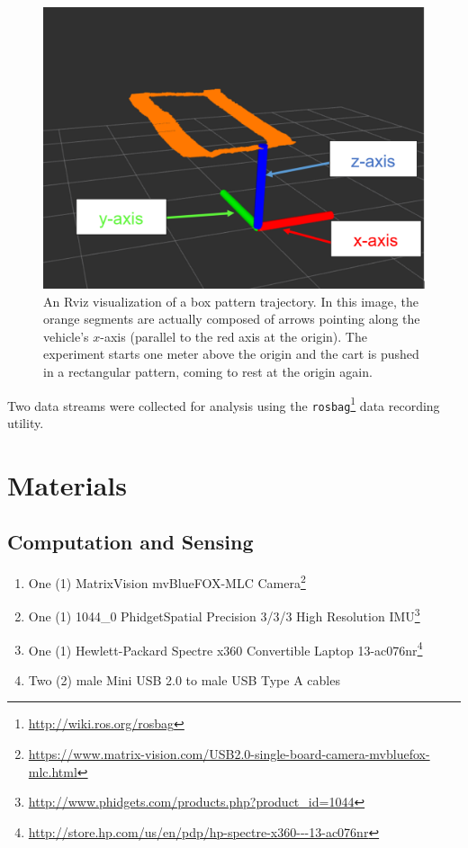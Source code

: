 \begin{figure}
  \centering
    \includegraphics[width=\textwidth]{good_box_5_cropped}
  \caption[Rviz Visualization of a Box Pattern Trajectory]{An Rviz visualization of a box pattern trajectory. In this image, the orange segments are actually composed of arrows pointing along the vehicle's $x$-axis (parallel to the red axis at the origin). The experiment starts one meter above the origin and the cart is pushed in a rectangular pattern, coming to rest at the origin again.}
  \label{fig:good_box}
\end{figure}


Two data streams were collected for analysis using the \texttt{rosbag}\footnote{\url{http://wiki.ros.org/rosbag}} data recording utility.

\clearpage
\section{Materials}
\subsection{Computation and Sensing}
\begin{enumerate}
\item One (1) MatrixVision mvBlueFOX-MLC Camera\footnote{\url{https://www.matrix-vision.com/USB2.0-single-board-camera-mvbluefox-mlc.html}}
\item One (1) 1044\_0 PhidgetSpatial Precision 3/3/3 High Resolution IMU\footnote{\url{http://www.phidgets.com/products.php?product_id=1044}}
\item One (1) Hewlett-Packard Spectre x360 Convertible Laptop 13-ac076nr\footnote{\url{http://store.hp.com/us/en/pdp/hp-spectre-x360---13-ac076nr}}
\item Two (2) male Mini USB 2.0 to male USB Type A cables
\end{enumerate}
